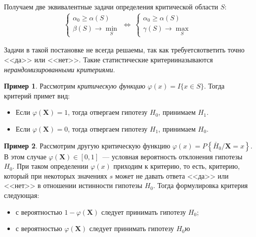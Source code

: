 \documentclass[oneside,final,14pt]{extreport}
\theoremstyle{definition}
\newtheorem*{exmp}{Пример}
\begin{document}
Получаем две эквивалентные задачи определения критической области $S$:
\begin{equation*}
    \begin{array}{l}
    \left\{\begin{array}{l}
    \alpha_{0} \geqslant \alpha(S) \\
    \beta(S) \rightarrow \min\limits_{S}
    \end{array}\right.
    \Leftrightarrow~
    \left\{\begin{array}{l}
    \alpha_{0} \geqslant \alpha(S) \\
    \gamma(S) \rightarrow \max\limits_{S}
    \end{array}\right.
    \end{array}
\end{equation*}

Задачи в такой постановке не всегда решаемы, так как требуетсяответить точно <<да>> или <<нет>>. Такие статистические критерииназываются {\it нерандомизированными критериями}.

\begin{exmp}
Рассмотрим {\it критическую функцию} $\varphi(x)=I\{x \in S\}$. Тогда критерий примет вид:
\begin{itemize}
    \item Если $\varphi\left(\mathbf{X}\right)=1$, тогда отвергаем гипотезу $H_0$, принимаем $H_1$.
    \item Если $\varphi\left(\mathbf{X}\right)=0$, тогда отвергаем гипотезу $H_1$, принимаем $H_0$.
\end{itemize}
\end{exmp}

\begin{exmp}
Рассмотрим другую критическую функцию $\varphi(x)=P\left\{\bar{H}_{0} / \mathbf{X}=x\right\}$. В этом случае $\varphi\left(\mathbf{X}\right) \in[0,1]$~--- условная вероятность отклонения гипотезы $H_0$. При таком определении $\varphi(x)$ приходим к { критерию}, то есть, критерию, который при некоторых значениях $s$ может не давать ответа <<да>> или <<нет>> в отношении истинности гипотезы $H_0$. Тогда формулировка критерия следующая:
\begin{itemize}
    \item с вероятностью $1 - \varphi\left(\mathbf{X}\right)$ следует принимать гипотезу $H_0$;
    \item с вероятностью $\varphi\left(\mathbf{X}\right)$ следует принимать гипотезу $H_0$ю
\end{itemize}
\end{exmp}
\end{document}
